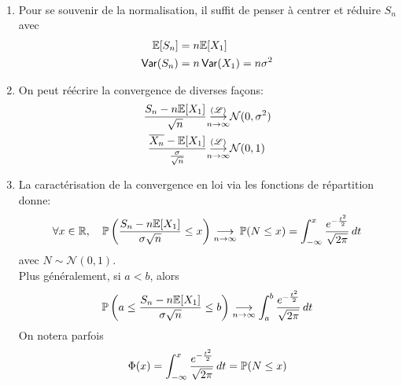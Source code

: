 \begin{remark}\,
    \begin{enumerate}
        \item Pour se souvenir de la normalisation, il suffit de 
        penser à centrer et réduire \(S_n\) avec
        \begin{equation*}
            \begin{aligned}
                \mathbb{E}[S_n] &= n\mathbb{E}[X_1]\\
                \operatorname{\mathsf{Var}}(S_n) &= n\operatorname{\mathsf{Var}}(X_1) = n\sigma^2
            \end{aligned}
        \end{equation*}

        \item On peut réécrire la convergence de diverses façons:
        \begin{equation*}
            \begin{aligned}
                \frac{S_n-n\mathbb{E}[X_1]}{\sqrt{n}} &\underset{n\to\infty}{{\overset{(\mathscr{L})}{\longrightarrow}}} \mathcal N(0,\sigma^2)\\
                \frac{\overline{X_n}-\mathbb{E}[X_1]}{\frac{\sigma}{\sqrt{n}}} &\underset{n\to\infty}{{\overset{(\mathscr{L})}{\longrightarrow}}} \mathcal N(0,1)\\
            \end{aligned}
        \end{equation*}

        \item La caractérisation de la convergence en loi via les fonctions de répartition
        donne:
        \begin{equation*}
            \forall x\in\mathbb{R},\quad \mathbb{P}\left(\frac{S_n-n\mathbb{E}[X_1]}{\sigma\sqrt{n}}\leq x\right) \underset{n\to\infty}{\longrightarrow} \mathbb{P}(N\leq x) = \int_{-\infty}^x \frac{e^{-\frac{t^2}{2}}}{\sqrt{2\pi}} \mathop{}\!{d} t
        \end{equation*}
        avec \(N\sim\mathcal N(0,1)\).\\
        Plus généralement, si \(a<b\), alors
        \begin{equation*}
            \mathbb{P}\left(a\leq \frac{S_n-n\mathbb{E}[X_1]}{\sigma\sqrt{n}}\leq b\right) \underset{n\to\infty}{\longrightarrow} \int_a^b \frac{e^{-\frac{t^2}{2}}}{\sqrt{2\pi}} \mathop{}\!{d} t
        \end{equation*}
        On notera parfois
        \begin{equation*}
            \Phi(x) = \int_{-\infty}^x \frac{e^{-\frac{t^2}{2}}}{\sqrt{2\pi}} \mathop{}\!{d} t = \mathbb{P}(N\leq x)
        \end{equation*}
    \end{enumerate}
\end{remark}

